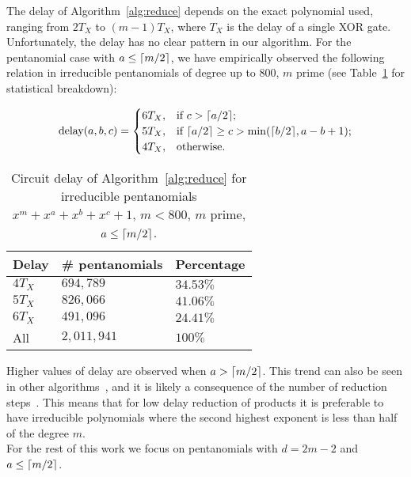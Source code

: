 The delay of Algorithm~\ref{alg:reduce} depends on the exact polynomial used, ranging from $2 T_X$ to $(m-1) T_X$, where $T_X$ is the delay of a single XOR gate. Unfortunately, the delay has no clear pattern in our algorithm. For the pentanomial case with $a \leq \lceil m/2\rceil$, we have empirically observed the following relation in irreducible pentanomials of degree up to 800, $m$ prime (see Table~\ref{table:reduce:delays} for statistical breakdown):

\[
    \text{delay}(a, b, c)= 
\begin{cases}
    6 T_X, & \text{if } c > \lceil a/2\rceil; \\
    5 T_X, & \text{if } \lceil a/2\rceil \geq c > \min(\lceil b/2\rceil, a-b+1); \\
    4 T_X, & \text{otherwise.}
\end{cases}
\]

\begin{table}
\centering
\caption{Circuit delay of Algorithm~\ref{alg:reduce} for irreducible pentanomials $x^m + x^a + x^b + x^c + 1$, $m < 800$, $m$ prime, $a \leq \lceil m/2\rceil$.}
{\begin{tabular}{l l l} \label{table:reduce:delays}
Delay & \# pentanomials & Percentage \\ \hline
$4 T_X$ & $694,789$ & $34.53\%$ \\ \hline
$5 T_X$ & $826,066$ & $41.06\%$ \\ \hline 
$6 T_X$ & $491,096$ & $24.41\%$ \\ \hline
All & $2,011,941$ & $100\%$
\end{tabular}}{}
\end{table}

Higher values of delay are observed when $a > \lceil m/2\rceil$. This trend can also be seen in other algorithms~\cite{fan2015survey}, and it is likely a consequence of the number of reduction steps~\cite{wu2002bit}. This means that for low delay reduction of products it is preferable to have irreducible polynomials where the second highest exponent is less than half of the degree $m$.\\

For the rest of this work we focus on pentanomials with $d=2m-2$ and $a \leq \lceil m/2\rceil$.



